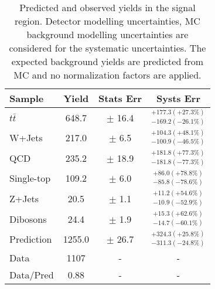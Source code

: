 \renewcommand{\arraystretch}{1.5}
\begin{table}
\begin{center}
\begin{tabular}{l|c|c|c}
Sample        &    Yield &  Stats Err &   Systs Err \\
\hline
$t\bar{t}$    &  648.7   & $\pm$ 16.4    & $^{+177.3(+27.3\%)}_{-169.2(-26.1\%)}$ \\
W+Jets        &  217.0   & $\pm$ 6.5     & $^{+104.3(+48.1\%)}_{-100.9(-46.5\%)}$ \\
QCD           &  235.2   & $\pm$ 18.9    & $^{+181.8(+77.3\%)}_{-181.8(-77.3\%)}$ \\
Single-top    &  109.2   & $\pm$ 6.0     & $^{+86.0(+78.8\%)}_{-85.8(-78.6\%)}$ \\
Z+Jets        &  20.5    & $\pm$ 1.1     & $^{+11.2(+54.6\%)}_{-10.9(-52.9\%)}$ \\
Dibosons      &  24.4    & $\pm$ 1.9     & $^{+15.3(+62.6\%)}_{-14.7(-60.1\%)}$ \\
\hline
Prediction    &  1255.0  & $\pm$ 26.7    & $^{+324.3(+25.8\%)}_{-311.3(-24.8\%)}$ \\
Data          &  1107    & - & - \\
\hline
Data/Pred     &  0.88    & - & - \\
\hline
\end{tabular}
\end{center}
\caption{Predicted and observed yields in the signal region. Detector modelling
uncertainties, MC background modelling uncertainties are considered for the systematic uncertainties.
The expected background yields are predicted from MC and no normalization factors are applied.}
\label{tab:boosted_results_sr_yields}
\end{table}
\renewcommand{\arraystretch}{1.0}
\FloatBarrier
 
